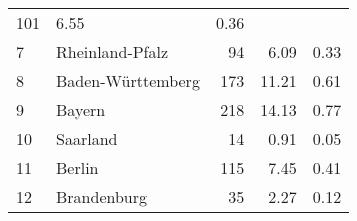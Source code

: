 \begin{longtable}{lXrrr}
       \num{101} &
       \num[round-mode=places,round-precision=2]{6,55} &
         \num[round-mode=places,round-precision=2]{0,36} \\

     7 &
     \multicolumn{1}{X}{ Rheinland-Pfalz   } &


       \num{94} &
       \num[round-mode=places,round-precision=2]{6,09} &
         \num[round-mode=places,round-precision=2]{0,33} \\

     8 &
     \multicolumn{1}{X}{ Baden-Württemberg   } &


       \num{173} &
       \num[round-mode=places,round-precision=2]{11,21} &
         \num[round-mode=places,round-precision=2]{0,61} \\

     9 &
     \multicolumn{1}{X}{ Bayern   } &


       \num{218} &
       \num[round-mode=places,round-precision=2]{14,13} &
         \num[round-mode=places,round-precision=2]{0,77} \\

     10 &
     \multicolumn{1}{X}{ Saarland   } &


       \num{14} &
       \num[round-mode=places,round-precision=2]{0,91} &
         \num[round-mode=places,round-precision=2]{0,05} \\

     11 &
     \multicolumn{1}{X}{ Berlin   } &


       \num{115} &
       \num[round-mode=places,round-precision=2]{7,45} &
         \num[round-mode=places,round-precision=2]{0,41} \\

     12 &
     \multicolumn{1}{X}{ Brandenburg   } &


       \num{35} &
       \num[round-mode=places,round-precision=2]{2,27} &
         \num[round-mode=places,round-precision=2]{0,12} \\


\end{longtable}
